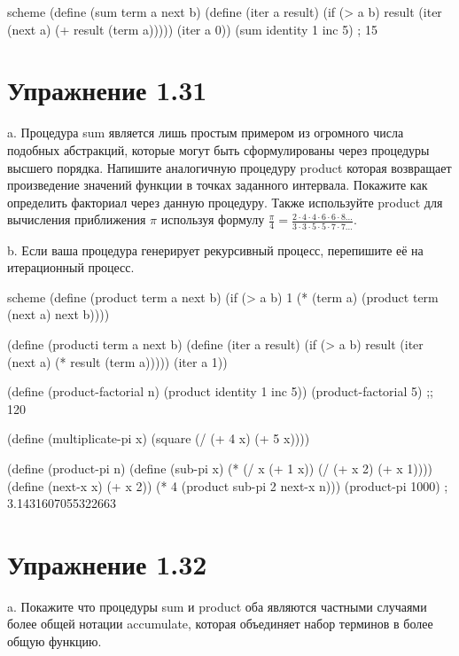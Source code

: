 \begin{codelisting}{scheme}
(define (sum term a next b)
  (define (iter a result)
    (if (> a b)
        result
        (iter (next a) (+ result (term a)))))
  (iter a 0))
(sum identity 1 inc 5) ; 15
\end{codelisting}

\chapter{Упражнение 1.31}

a. Процедура sum является лишь простым примером из огромного числа подобных абстракций, которые могут быть сформулированы через процедуры высшего порядка. Напишите аналогичную процедуру product которая возвращает произведение значений функции в точках заданного интервала. Покажите как определить факториал через данную процедуру. Также используйте product для вычисления приближения $\pi$ используя формулу $\frac{\pi}{4}=\frac{2\cdot4\cdot4\cdot6\cdot6\cdot8...}{3\cdot3\cdot5\cdot5\cdot7\cdot7...}$.

b. Если ваша процедура генерирует рекурсивный процесс, перепишите её на итерационный процесс.

\begin{codelisting}{scheme}
(define (product term a next b)
  (if (> a b)
      1
      (* (term a)
         (product term (next a) next b))))

(define (producti term a next b)
  (define (iter a result)
    (if (> a b)
        result
        (iter (next a) (* result (term a)))))
  (iter a 1))

(define (product-factorial n)
  (product identity 1 inc 5))
(product-factorial 5) ;; 120

(define (multiplicate-pi x)
  (square (/ (+ 4 x) (+ 5 x))))

(define (product-pi n)
  (define (sub-pi x)
    (* (/ x (+ 1 x)) (/ (+ x 2) (+ x 1))))
  (define (next-x x)
    (+ x 2))
  (* 4 (product sub-pi 2 next-x n)))
(product-pi 1000) ; 3.1431607055322663
\end{codelisting}

\chapter{Упражнение 1.32}

a. Покажите что процедуры sum и product оба являются частными случаями более общей нотации accumulate, которая объединяет набор терминов в более общую функцию.

